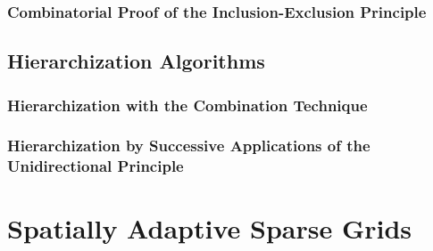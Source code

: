 
\subsubsection{Combinatorial Proof of the Inclusion-Exclusion Principle}


\subsection{Hierarchization Algorithms}


\subsubsection{Hierarchization with the Combination Technique}


\subsubsection{%
  Hierarchization by Successive Applications of the Unidirectional Principle%
}


\section{Spatially Adaptive Sparse Grids}


\cite{zenger91}

\blindmathpaper
